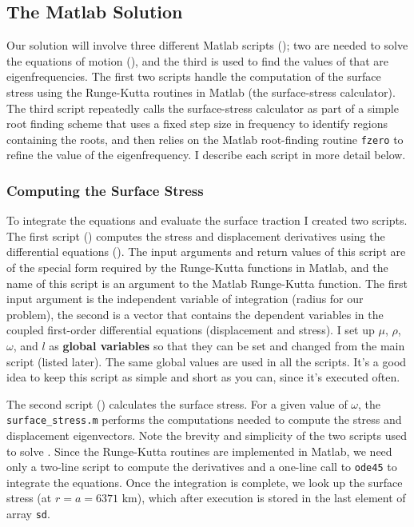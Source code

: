 \documentclass[11pt,titlepage,fleqn]{article}
\begin{document}

\subsection{The Matlab Solution}

Our solution will involve three different Matlab scripts (); two are needed to solve the equations of motion (), and the third is used to find the values of that are eigenfrequencies. The first two scripts handle the computation of the surface stress using the Runge-Kutta routines in Matlab (the surface-stress calculator). The third script repeatedly calls the surface-stress calculator as part of a simple root finding scheme that uses a fixed step size in frequency to identify regions containing the roots, and then relies on the Matlab root-finding routine \verb+fzero+ to refine the value of the eigenfrequency. I describe each script in more detail below.

\subsubsection{Computing the Surface Stress}

To integrate the equations and evaluate the surface traction I created two scripts. The first script () computes the stress and displacement derivatives using the differential equations (). The input arguments and return values of this script are of the special form required by the Runge-Kutta functions in Matlab, and the name of this script is an argument to the Matlab Runge-Kutta function. The first input argument is the independent variable of integration (radius for our problem), the second is a vector that contains the dependent variables in the coupled first-order differential equations (displacement and stress). I set up $\mu$, $\rho$, $\omega$, and $l$ as {\bf global variables} so that they can be set and changed from the main script (listed later). The same global values are used in all the scripts. It's a good idea to keep this script as simple and short as you can, since it's executed often.

The second script () calculates the surface stress. For a given value of $\omega$, the \verb+surface_stress.m+ performs the computations needed to compute the stress and displacement eigenvectors. Note the brevity and simplicity of the two scripts used to solve . Since the Runge-Kutta routines are implemented in Matlab, we need only a two-line script to compute the derivatives and a one-line call to \verb+ode45+ to integrate the equations. Once the integration is complete, we look up the surface stress (at $r = a = 6371$ km), which after execution is stored in the last element of array \verb+sd+.
\end{document}
